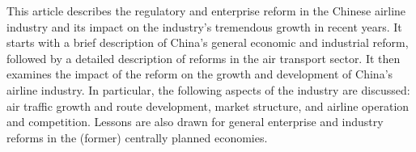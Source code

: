 This article describes the regulatory and enterprise reform in the Chinese airline industry and its impact on the industry’s tremendous growth in recent years. It starts with a brief description of China’s general economic and industrial reform, followed by a detailed description of reforms in the air transport sector. It then examines the impact of the reform on the growth and development of China’s airline industry. In particular, the following aspects of the industry are discussed: air traffic growth and route development, market structure, and airline operation and competition. Lessons are also drawn for general enterprise and industry reforms in the (former) centrally planned economies.
